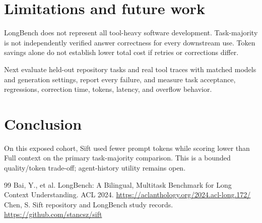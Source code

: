 \documentclass[11pt]{article}
\begin{document}
\section{Limitations and future work}
LongBench does not represent all tool-heavy software development. Task-majority is not independently verified answer correctness for every downstream use. Token savings alone do not establish lower total cost if retries or corrections differ.\par
Next evaluate held-out repository tasks and real tool traces with matched models and generation settings, report every failure, and measure task acceptance, regressions, correction time, tokens, latency, and overflow behavior.\par
\section{Conclusion}
On this exposed cohort, Sift used fewer prompt tokens while scoring lower than Full context on the primary task-majority comparison. This is a bounded quality/token trade-off; agent-history utility remains open.\par
\begin{thebibliography}{99}
 Bai, Y., et al. LongBench: A Bilingual, Multitask Benchmark for Long Context Understanding. ACL 2024. \url{https://aclanthology.org/2024.acl-long.172/}
 Chen, S. Sift repository and LongBench study records. \url{https://github.com/stancsz/sift}
\end{thebibliography}
\end{document}
